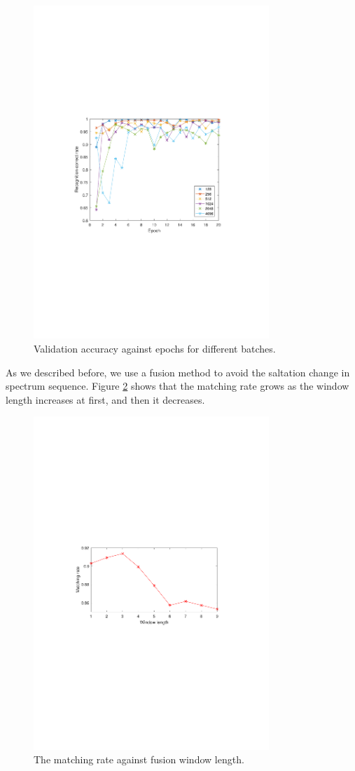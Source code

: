 \begin{figure}[!t]
	\centering
	\includegraphics[width=3.5in]{figures/epoch}
	\caption{Validation accuracy against epochs for different batches.}
	\label{fig:epoch}
\end{figure}
As we described before, we use a fusion method to avoid the saltation change in spectrum sequence. Figure \ref{fig:window} shows that the matching rate grows as the window length increases at first, and then it decreases.
\begin{figure}[!t]
	\centering
	\includegraphics[width=3.5in]{figures/window}
	\caption{The matching rate against fusion window length.}
	\label{fig:window}
\end{figure}
